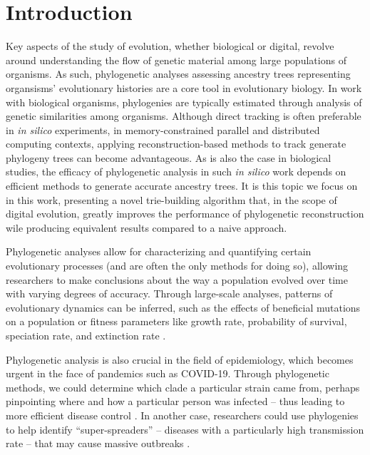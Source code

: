 \section{Introduction} \label{sec:introduction}

Key aspects of the study of evolution, whether biological or digital, revolve around understanding the flow of genetic material among large populations of organisms.
As such, phylogenetic analyses assessing ancestry trees representing organsisms' evolutionary histories are a core tool in evolutionary biology.
In work with biological organisms, phylogenies are typically estimated through analysis of genetic similarities among organisms.
Although direct tracking is often preferable in \textit{in silico} experiments, in memory-constrained parallel and distributed computing contexts, applying reconstruction-based methods to track generate phylogeny trees can become advantageous.
As is also the case in biological studies, the efficacy of phylogenetic analysis in such \textit{in silico} work depends on efficient methods to generate accurate ancestry trees.
It is this topic we focus on in this work, presenting a novel trie-building algorithm that, in the scope of digital evolution, greatly improves the performance of phylogenetic reconstruction wile producing equivalent results compared to a naive approach.

Phylogenetic analyses allow for characterizing and quantifying certain evolutionary processes (and are often the only methods for doing so), allowing researchers to make conclusions about the way a population evolved over time with varying degrees of accuracy.
Through large-scale analyses, patterns of evolutionary dynamics can be inferred, such as the effects of beneficial mutations on a population or fitness parameters like growth rate, probability of survival, speciation rate, and extinction rate \citep{genthon2023cell, levy2015quantitative, stadler2013recovering}.

Phylogenetic analysis is also crucial in the field of epidemiology, which becomes urgent in the face of pandemics such as COVID-19.
Through phylogenetic methods, we could determine which clade a particular strain came from, perhaps pinpointing where and how a particular person was infected -- thus leading to more efficient disease control \citep{wang2020role}.
In another case, researchers could use phylogenies to help identify ``super-spreaders'' -- diseases with a particularly high transmission rate -- that may cause massive outbreaks \citep{colijn2014phylogenetic}.

